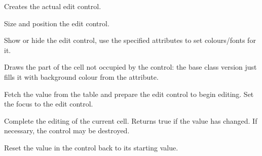 
\label{wxgridcelleditorcreate}


Creates the actual edit control.

\label{wxgridcelleditorsetsize}


Size and position the edit control.

\label{wxgridcelleditorshow}


Show or hide the edit control, use the specified attributes to set
colours/fonts for it.

\label{wxgridcelleditorpaintbackground}


Draws the part of the cell not occupied by the control: the base class
version just fills it with background colour from the attribute.

\label{wxgridcelleditorbeginedit}


Fetch the value from the table and prepare the edit control
to begin editing. Set the focus to the edit control.

\label{wxgridcelleditorendedit}


Complete the editing of the current cell. Returns true if the value has
changed. If necessary, the control may be destroyed.

\label{wxgridcelleditorreset}


Reset the value in the control back to its starting value.

\label{wxgridcelleditorstartingkey}

